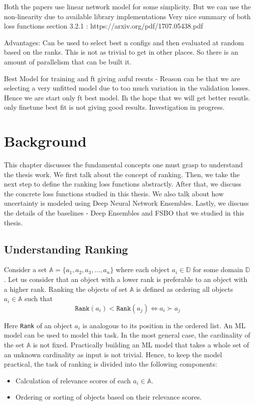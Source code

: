 \documentclass[12pt, twoside, ngerman]{report}
\begin{document}
    Both the papers use linear network model for some simplicity. But we can use the non-linearity due to available library
        implementations
    Very nice summary of both loss functions section 3.2.1 : https://arxiv.org/pdf/1707.05438.pdf 

Advantages:
    Can be used to select best n configs and then evaluated at random based on the ranks. This is not as trivial to get in other
    places. So there is an amount of parallelism that can be built it.

Best Model for training and ft giving auful resuts - Reason can be that we are selecting a very unfitted model due to too much variation in the validation losses.
Hence we are start only ft best model. Ih the hope that we will get better resutls.
only finetune best fit is not giving good results. Investigation in progress. 

\fi


\chapter{Background}
\label{chap:Background}

This chapter discusses the fundamental concepts one must grasp to understand the thesis work. 
We first talk about the concept of ranking.
Then, we take the next step to define the ranking loss functions abstractly.
After that, we discuss the concrete loss functions studied in this thesis.
We also talk about how uncertainty is modeled using Deep Neural Network Ensembles.
Lastly,  we discuss the details of the baselines - Deep Ensembles and FSBO that we studied in this thesis.

\section{Understanding Ranking}

Consider a set $\mathbb{A} = \{a_1,  a_2,  a_3, ... ,  a_n\}$ where each object $a_i \in \mathbb{D}$ for some domain $\mathbb{D}$.
Let us consider that an object with a lower rank is preferable to an object with a higher rank.
Ranking the objects of set $\mathbb{A}$ is defined as ordering all objects $a_i \in \mathbb{A}$ such that
$$
\texttt{Rank}(a_i) < \texttt{Rank}(a_j) \iff a_i  \succ a_j
$$

Here \texttt{Rank} of an object $a_i$ is analogous to its position in the ordered list.
An ML model can be used to model this task.
In the most general case, the cardinality of the set $\mathbb{A}$ is not fixed.
Practically building an ML model that takes a whole set of an unknown cardinality as input is not trivial.
Hence, to keep the model practical, the task of ranking is divided into the following components:~\cite{procedureforrankinginintro}
\begin{itemize}
\item Calculation of relevance scores of each $a_i \in \mathbb{A}$.
\item Ordering or sorting of objects based on their relevance scores. 
\end{itemize}
\end{document}
